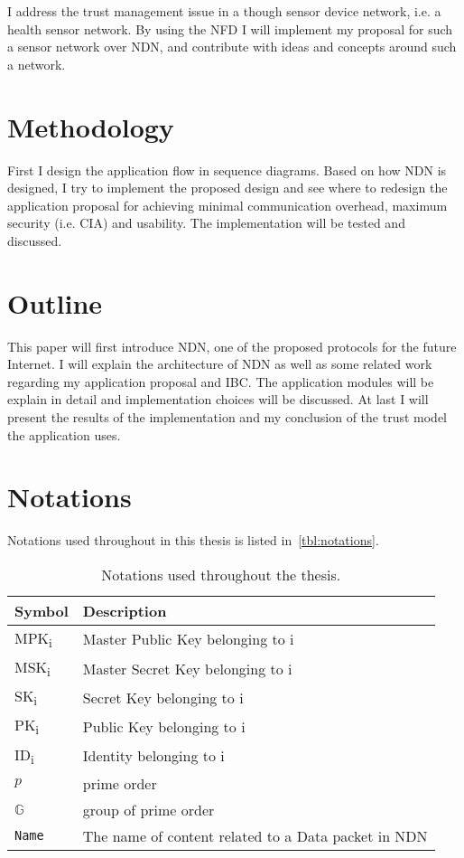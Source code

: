 I address the trust management issue in a though sensor device network, i.e. a health sensor network.
By using the \gls{NFD} I will implement my proposal for such a sensor network over \gls{NDN}, and contribute with ideas and concepts around such a network.

\section{Methodology}

First I design the application flow in sequence diagrams.
Based on how \gls{NDN} is designed, I try to implement the proposed design and see where to redesign the application proposal for achieving minimal communication overhead, maximum security (i.e. \gls{CIA}) and usability.
The implementation will be tested and discussed.

\section{Outline}

This paper will first introduce \gls{NDN}, one of the proposed protocols for the future Internet.
I will explain the architecture of \gls{NDN} as well as some related work regarding my application proposal and \gls{IBC}. 
The application modules will be explain in detail and implementation choices will be discussed.
At last I will present the results of the implementation and my conclusion of the trust model the application uses.

\section{Notations}
Notations used throughout in this thesis is listed in~\autoref{tbl:notations}.
\begin{table}[h]
  \begin{tabular}[c]{p{}p{}}
  \hline
  Symbol                    & Description                           \\ \hline
  MPK\textsubscript{i}      & Master Public Key belonging to i      \\ %
  MSK\textsubscript{i}      & Master Secret Key belonging to i      \\ %
  SK\textsubscript{i}       & Secret Key belonging to i             \\ %
  PK\textsubscript{i}       & Public Key belonging to i             \\ %
  ID\textsubscript{i}       & Identity belonging to i               \\ %
  $p$                       & prime order                           \\
  $\mathbb{G}$              & group of prime order                  \\
  \texttt{Name}             & The name of content related to a Data packet in NDN  \\
  \end{tabular}
  \caption{Notations used throughout the thesis.}
  \label{tbl:notations}
\end{table}